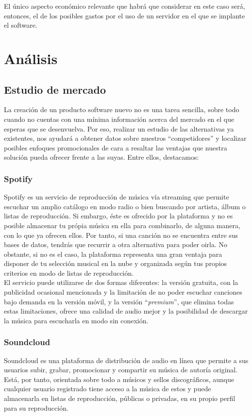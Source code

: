 El único aspecto económico relevante que habrá que considerar en este caso será, entonces, el de los posibles gastos por el uso de un servidor en el que se implante el software.

\section{Análisis}
\label{sec:analisis}

\subsection{Estudio de mercado}

La creación de un producto software nuevo no es una tarea sencilla, sobre todo cuando no cuentas con una mínima información acerca del mercado en el que esperas que se desenvuelva. Por eso, realizar un estudio de las alternativas ya existentes, nos ayudará a obtener datos sobre nuestros ``competidores'' y localizar posibles enfoques promocionales de cara a resaltar las ventajas que nuestra solución pueda ofrecer frente a las suyas. Entre ellos, destacamos:

\subsubsection{Spotify \cite{Spotify}}
Spotify es un servicio de reproducción de música vía streaming que permite escuchar un amplio catálogo en modo radio o bien buscando por artista, álbum o listas de reproducción. Si embargo, éste es ofrecido por la plataforma y no es posible almacenar tu própia música en ella para combinarlo, de alguna manera, con lo que ya ofrecen ellos. Por tanto, si una canción no se encuentra entre sus bases de datos, tendrás que recurrir a otra alternativa para poder oirla. No obstante, si no es el caso, la plataforma representa una gran ventaja para disponer de tu selección musical en la nube y organizada según tus propios criterios en modo de listas de reproducción.\\

El servicio puede utilizarse de dos formas diferentes: la versión gratuita, con la publicidad ocasional mencionada y la limitación de no poder escuchar canciones bajo demanda en la versión móvil, y la versión ``\textit{premium}'', que elimina todas estas limitaciones, ofrece una calidad de audio mejor y la posibilidad de descargar la música para escucharla en modo sin conexión.

\subsubsection{Soundcloud \cite{Soundcloud}}
Soundcloud es una plataforma de distribución de audio en línea que permite a sus usuarios subir, grabar, promocionar y compartir su música de autoría original. Está, por tanto, orientada sobre todo a músicos y sellos discográficos, aunque cualquier usuario registrado tiene acceso a la música de estos y puede almacenarla en listas de reproducción, públicas o privadas, en su propio perfil para su reproducción.\\

